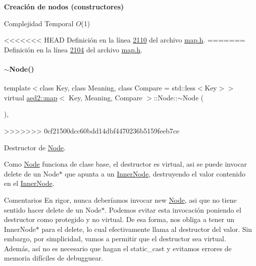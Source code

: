 \begin{Indent}{\bf \-Creación de nodos (constructores)}
\begin{DoxyDescription}
\item[Complejidad Temporal]$O$(1)
\end{DoxyDescription}

<<<<<<< HEAD
\-Definición en la línea \hyperlink{map_8h_source_l02110}{2110} del archivo \hyperlink{map_8h_source}{map.\-h}.
=======
Definición en la línea \hyperlink{map_8h_source_l02104}{2104} del archivo \hyperlink{map_8h_source}{map.\+h}.

\mbox{\label{structaed2_1_1map_1_1Node_a4f3cb2cc4302fe96432e624ced147540_a4f3cb2cc4302fe96432e624ced147540}} 
\paragraph{\texorpdfstring{$\sim$\+Node()}{~Node()}}
{\footnotesize\ttfamily template$<$class Key, class Meaning, class Compare = std\+::less$<$\+Key$>$$>$ \\
virtual \hyperlink{classaed2_1_1map}{aed2\+::map}$<$ Key, Meaning, Compare $>$\+::Node\+::$\sim$\+Node (\begin{DoxyParamCaption}{ }\end{DoxyParamCaption})\hspace{0.3cm}{\ttfamily [inline]}, {\ttfamily [virtual]}}
>>>>>>> 0cf21500dcc60bdd14dbf4470236b5159feeb7ce



Destructor de \hyperlink{structaed2_1_1map_1_1Node}{Node}. 

Como \hyperlink{structaed2_1_1map_1_1Node}{Node} funciona de clase base, el destructor es virtual, asi se puede invocar delete de un Node$\ast$ que apunta a un \hyperlink{structaed2_1_1map_1_1InnerNode}{Inner\+Node}, destruyendo el valor contenido en el \hyperlink{structaed2_1_1map_1_1InnerNode}{Inner\+Node}.

\begin{DoxyRemark}{Comentarios}
En rigor, nunca deberíamos invocar new \hyperlink{structaed2_1_1map_1_1Node}{Node}, asi que no tiene sentido hacer delete de un Node$\ast$. Podemos evitar esta invocación poniendo el destructor como protegido y no virtual. De esa forma, nos obliga a tener un Inner\+Node$\ast$ para el delete, lo cual efectivamente llama al destructor del valor. Sin embargo, por simplicidad, vamos a permitir que el destructor sea virtual. Además, así no es necesario que hagan el {\ttfamily static\+\_\+cast} y evitamos errores de memoria difíciles de debugguear. 
\end{DoxyRemark}



\end{Indent}
